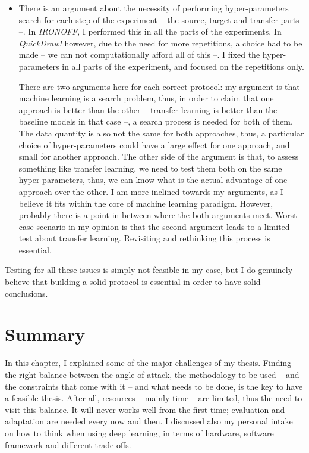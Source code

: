\begin{itemize}
      \item There is an argument about the necessity of performing hyper-parameters search for each step of the experiment -- the source, target and transfer parts --. In \textit{IRONOFF}, I performed this in all the parts of the experiments. In \textit{QuickDraw!} however, due to the need for more repetitions, a choice had to be made -- we can not computationally afford all of this --. I fixed the hyper-parameters in all parts of the experiment, and focused on the repetitions only.

      There are two arguments here for each correct protocol: my argument is that machine learning is a search problem, thus, in order to claim that one approach is better than the other -- transfer learning is better than the baseline models in that case --, a search process is needed for both of them. The data quantity is also not the same for both approaches, thus, a particular choice of hyper-parameters could have a large effect for one approach, and small for another approach. The other side of the argument is that, to assess something like transfer learning, we need to test them both on the same hyper-parameters, thus, we can know what is the actual advantage of one approach over the other. I am more inclined towards my arguments, as I believe it fits within the core of machine learning paradigm. However, probably there is a point in between where the both arguments meet. Worst case scenario in my opinion is that the second argument leads to a limited test about transfer learning. Revisiting and rethinking this process is essential.
    \end{itemize}
    \par Testing for all these issues is simply not feasible in my case, but I do genuinely believe that building a solid protocol is essential in order to have solid conclusions.


  \section{Summary}
  \par In this chapter, I explained some of the major challenges of my thesis. Finding the right balance between the angle of attack, the methodology to be used -- and the constraints that come with it -- and what needs to be done, is the key to have a feasible thesis. After all, resources -- mainly time -- are limited, thus the need to visit this balance. It will never works well from the first time; evaluation and adaptation are needed every now and then. I discussed also my personal intake on how to think when using deep learning, in terms of hardware, software framework and different trade-offs.

